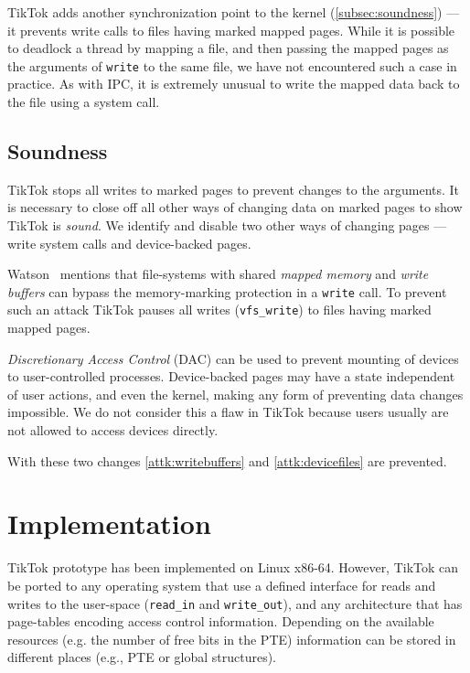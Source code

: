 \documentclass[conference]{IEEEtran}
\newcommand{\sysname}{TikTok}
\begin{document}
\sysname{} adds another synchronization point to the kernel
(\autoref{subsec:soundness}) --- it prevents write calls to files having marked
mapped pages. While it is possible to deadlock a thread by mapping a file, and
then passing the mapped pages as the arguments of \texttt{write} to the same
file, we have not encountered such a case in practice. As with IPC, it is
extremely unusual to write the mapped data back to the file using a system call.

\subsection{Soundness}
\label{subsec:soundness}

\sysname{} stops all writes to marked pages to prevent changes to the arguments.
It is necessary to close off all other ways of changing data on marked pages to
show \sysname{} is \emph{sound}. We identify and disable two other ways of
changing pages --- write system calls and device-backed pages.

Watson~\cite{watson2007exploiting} mentions that file-systems with shared
\emph{mapped memory} and \emph{write buffers} can bypass the memory-marking
protection in a \texttt{write} call. To prevent such an attack \sysname{} pauses
all writes (\texttt{vfs\_write}) to files having marked mapped pages.

\emph{Discretionary Access Control} (DAC) can be used to prevent mounting of
devices to user-controlled processes. Device-backed pages may have a state
independent of user actions, and even the kernel, making any form of preventing
data changes impossible. We do not consider this a flaw in \sysname{} because
users usually are not allowed to access devices directly.

With these two changes \autoref{attk:writebuffers} and \autoref{attk:devicefiles}
are prevented.


\section{Implementation}
\label{sec:implementation}

\sysname{} prototype has been implemented on Linux x86-64. However, \sysname{}
can be ported to any operating system that use a defined interface for reads and
writes to the user-space (\texttt{read\_in} and \texttt{write\_out}), and any
architecture that has page-tables encoding access control information. Depending
on the available resources (e.g. the number of free bits in the PTE) information
can be stored in different places (e.g., PTE or global structures).
\end{document}
